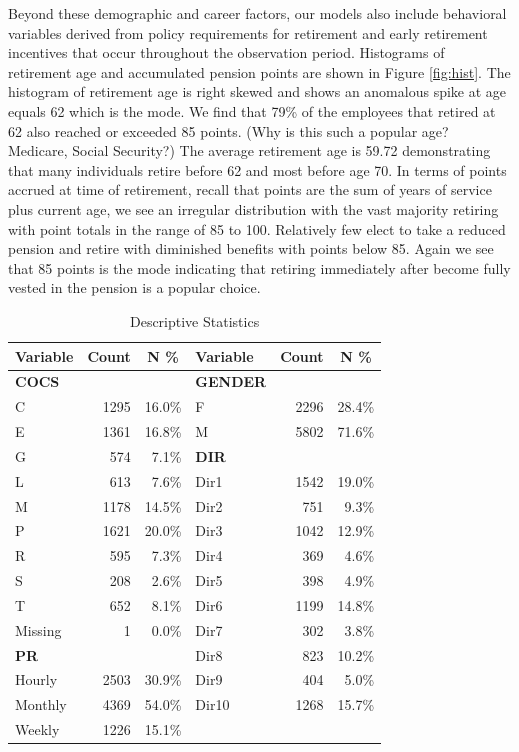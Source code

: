 \documentclass[12pt,letterpaper]{article}
\begin{document}
Beyond these demographic and career factors, our models also include behavioral variables derived from policy requirements for retirement and early retirement incentives that occur throughout the observation period. Histograms of retirement age and accumulated pension points are shown in Figure \ref{fig:hist}. The histogram of retirement age is right skewed and shows an anomalous spike at age equals 62 which is the mode.  We find that 79\% of the employees that retired at 62 also reached or exceeded 85 points. (Why is this such a popular age?  Medicare, Social Security?)  The average retirement age is 59.72 demonstrating that many individuals retire before 62 and most before age 70. In terms of points accrued at time of retirement, recall that points are the sum of years of service plus current age, we see an irregular distribution with the vast majority retiring with point totals in the range of 85 to 100. Relatively few elect to take a reduced pension and retire with diminished benefits with points below 85. Again we see that 85 points is the mode indicating that retiring immediately after become fully vested in the pension is a popular choice.
\begin{table}[htbp]
	\centering
	\scriptsize
	\renewcommand{\arraystretch}{1.5}
	\caption{Descriptive Statistics}
	\begin{tabular}{lrrlrr}
		\toprule
		\textbf{Variable}	& \multicolumn{1}{c}{\textbf{Count}} & \multicolumn{1}{c}{\textbf{N \%}}  &   \textbf{Variable}    & \multicolumn{1}{c}{\textbf{Count}} & \multicolumn{1}{c}{\textbf{N \%}} \\
		\midrule
		\textbf{COCS} &       &       & \textbf{GENDER} &       &  \\
		C     & 1295  & 16.0\% & F     & 2296  & 28.4\% \\
		E     & 1361  & 16.8\% & M     & 5802  & 71.6\% \\
		G     & 574   & 7.1\% & \textbf{DIR} &       &  \\
		L     & 613   & 7.6\% & Dir1 & 1542  & 19.0\% \\
		M     & 1178  & 14.5\% & Dir2 & 751   & 9.3\% \\
		P     & 1621  & 20.0\% & Dir3 & 1042  & 12.9\% \\
		R     & 595   & 7.3\% & Dir4 & 369   & 4.6\% \\
		S     & 208   & 2.6\% & Dir5 & 398   & 4.9\% \\
		T     & 652   & 8.1\% & Dir6 & 1199  & 14.8\% \\
		Missing & 1     & 0.0\% & Dir7 & 302   & 3.8\% \\
		\textbf{PR} &  &   & Dir8 & 823   & 10.2\% \\
		Hourly & 2503  & 30.9\% & Dir9 & 404   & 5.0\% \\
		Monthly & 4369  & 54.0\% & Dir10 & 1268  & 15.7\% \\
		Weekly & 1226  & 15.1\% &       &       &  \\
		\bottomrule
	\end{tabular}%
	\label{tab:descriptive}%
\end{table}%
\end{document}
